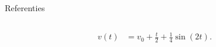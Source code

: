 \begin{frame}[fragile,t]{Referenties}
\begin{columns}[t]
\begin{column}{0.5\textwidth}
\begin{adjustbox}{frame=1pt 10pt,valign=t}
\begin{minipage}{\textwidth-22pt}
\begin{onlyenv}
{\begin{align*}
                                v(t) & = v_0 + \frac{t}{2} + \frac{1}{4}\sin(2t).
                            \end{align*}
                        }%
                    \end{onlyenv}%
                \end{minipage}
            \end{adjustbox}
        \end{column}
    \end{columns}
\end{frame}








